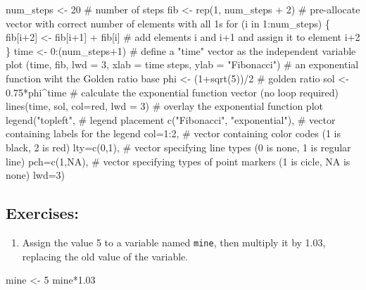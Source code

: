 \documentclass[
  letterpaper,
  DIV=11,
  numbers=noendperiod]{scrreprt}
\newenvironment{Shaded}{\begin{snugshade}}{\end{snugshade}}
\newcommand{\NormalTok}[1]{\textcolor[rgb]{0.00,0.23,0.31}{#1}}
\providecommand{\tightlist}{%
  \setlength{\itemsep}{0pt}\setlength{\parskip}{0pt}}\usepackage{longtable,booktabs,array}
\begin{document}
\begin{Shaded}
\begin{Highlighting}[]
\NormalTok{num\_steps \textless{}{-} 20 \# number of steps}
\NormalTok{fib \textless{}{-} rep(1, num\_steps + 2) \# pre{-}allocate vector with correct number of elements with all 1s}
\NormalTok{for (i in 1:num\_steps) \{}
\NormalTok{  fib[i+2] \textless{}{-} fib[i+1] + fib[i] \# add elements i and i+1 and assign it to element i+2}
\NormalTok{\}}
\NormalTok{time \textless{}{-} 0:(num\_steps+1) \# define a "time" vector as the independent variable}
\NormalTok{plot (time, fib, lwd = 3, xlab = \textquotesingle{}time steps\textquotesingle{}, ylab = "Fibonacci")}
\NormalTok{\# an exponential function wiht the Golden ratio base}
\NormalTok{phi \textless{}{-} (1+sqrt(5))/2 \# golden ratio}
\NormalTok{sol \textless{}{-} 0.75*phi\^{}time \# calculate the exponential function vector (no loop required)}
\NormalTok{lines(time, sol, col=\textquotesingle{}red\textquotesingle{}, lwd = 3) \# overlay the exponential function plot}
\NormalTok{legend("topleft", \# legend placement}
\NormalTok{       c("Fibonacci", "exponential"), \# vector containing labels for the legend}
\NormalTok{       col=1:2, \# vector containing color codes (1 is black, 2 is red)}
\NormalTok{       lty=c(0,1), \# vector specifying line types (0 is none, 1 is regular line)}
\NormalTok{       pch=c(1,NA), \# vector specifying types of point markers (1 is cicle, NA is none)}
\NormalTok{       lwd=3) }
\end{Highlighting}
\end{Shaded}

\hypertarget{exercises-15}{%
\subsection*{Exercises:}\label{exercises-15}}

\begin{enumerate}
\def\labelenumi{\arabic{enumi}.}
\tightlist
\item
  Assign the value 5 to a variable named \texttt{mine}, then multiply it
  by 1.03, replacing the old value of the variable.
\end{enumerate}

\begin{Shaded}
\begin{Highlighting}[]
\NormalTok{mine \textless{}{-} 5}
\NormalTok{mine*1.03}
\end{Highlighting}
\end{Shaded}
\end{document}

